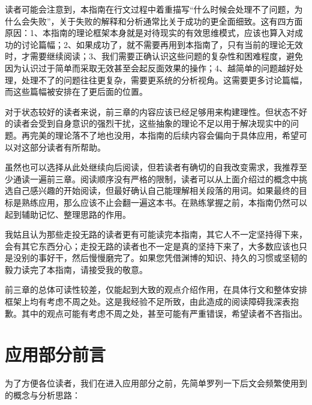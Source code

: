 \label{para:只写失败}读者可能会注意到，本指南在行文过程中着重描写“什么时候会处理不了问题，为什么会失败”，关于失败的解释和分析通常比关于成功的更全面细致。这有四方面原因：1、本指南的理论框架本身就是对待现实的有效思维模式，应该也算入对成功的讨论篇幅；2、如果成功了，就不需要再用到本指南了，只有当前的理论无效时，才需要继续阅读；3、我们需要正确认识这些问题的复杂性和困难程度，避免因为认识过于简单而采取无效甚至会起反面效果的操作；4、越简单的问题越好处理，处理不了的问题往往更复杂，需要更系统的分析视角。这需要更多讨论篇幅，而这些篇幅被安排在了更后面的位置。

对于状态较好的读者来说，前三章的内容应该已经足够用来构建理性。但状态不好的读者会受到自身意识的强烈干扰，这些抽象的理论不足以用于解决现实中的问题。再完美的理论落不了地也没用，本指南的后续内容会偏向于具体应用，希望可以对这部分读者有所帮助。

虽然也可以选择从此处继续向后阅读，但若读者有确切的自我改变需求，我推荐至少通读一遍前三章。阅读顺序没有严格的限制，读者可以从上面介绍过的概念中挑选自己感兴趣的开始阅读，但最好确认自己能理解相关段落的用词。如果最终的目标是熟练应用，那么应该不止会翻一遍这本书。在熟练掌握之前，本指南仍然可以起到辅助记忆、整理思路的作用。

我姑且认为那些走投无路的读者更有可能读完本指南，其它人不一定坚持得下来，会有其它东西分心；走投无路的读者也不一定是真的坚持下来了，大多数应该也只是没别的事好干，然后慢慢磨完了。如果您凭借渊博的知识、持久的习惯或坚韧的毅力读完了本指南，请接受我的敬意。

前三章的总体可读性较差，仅能起到大致的观点介绍作用，在具体行文和整体安排框架上均有考虑不周之处。这是我经验不足所致，由此造成的阅读障碍我深表抱歉。其中的观点可能有考虑不周之处，甚至可能有严重错误，希望读者不吝指出。

\newpage

\chapter{应用部分前言\label{sec:应用部分前言}}
为了方便各位读者，我们在进入应用部分之前，先简单罗列一下后文会频繁使用到的概念与分析思路：

